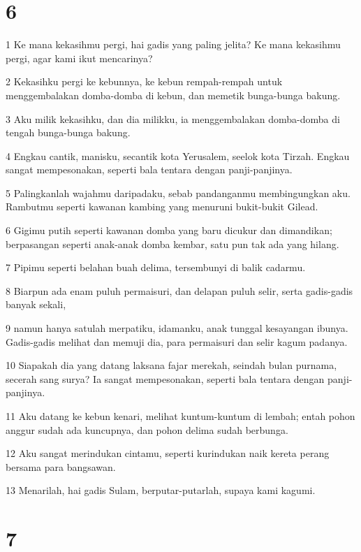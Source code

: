 \chapter{6}

\par 1 Ke mana kekasihmu pergi, hai gadis yang paling jelita? Ke mana kekasihmu pergi, agar kami ikut mencarinya?
\par 2 Kekasihku pergi ke kebunnya, ke kebun rempah-rempah untuk menggembalakan domba-domba di kebun, dan memetik bunga-bunga bakung.
\par 3 Aku milik kekasihku, dan dia milikku, ia menggembalakan domba-domba di tengah bunga-bunga bakung.
\par 4 Engkau cantik, manisku, secantik kota Yerusalem, seelok kota Tirzah. Engkau sangat mempesonakan, seperti bala tentara dengan panji-panjinya.
\par 5 Palingkanlah wajahmu daripadaku, sebab pandanganmu membingungkan aku. Rambutmu seperti kawanan kambing yang menuruni bukit-bukit Gilead.
\par 6 Gigimu putih seperti kawanan domba yang baru dicukur dan dimandikan; berpasangan seperti anak-anak domba kembar, satu pun tak ada yang hilang.
\par 7 Pipimu seperti belahan buah delima, tersembunyi di balik cadarmu.
\par 8 Biarpun ada enam puluh permaisuri, dan delapan puluh selir, serta gadis-gadis banyak sekali,
\par 9 namun hanya satulah merpatiku, idamanku, anak tunggal kesayangan ibunya. Gadis-gadis melihat dan memuji dia, para permaisuri dan selir kagum padanya.
\par 10 Siapakah dia yang datang laksana fajar merekah, seindah bulan purnama, secerah sang surya? Ia sangat mempesonakan, seperti bala tentara dengan panji-panjinya.
\par 11 Aku datang ke kebun kenari, melihat kuntum-kuntum di lembah; entah pohon anggur sudah ada kuncupnya, dan pohon delima sudah berbunga.
\par 12 Aku sangat merindukan cintamu, seperti kurindukan naik kereta perang bersama para bangsawan.
\par 13 Menarilah, hai gadis Sulam, berputar-putarlah, supaya kami kagumi.

\chapter{7}

